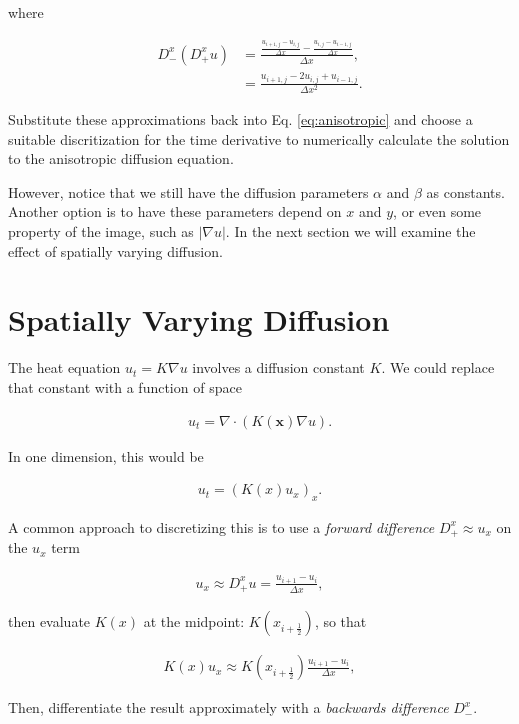 \documentclass[11pt,a4paper,noindent]{article}
\begin{document}
where 

\begin{align}
 D_-^x (D_+^x u) &= \frac{\frac{u_{i+1,j}-u_{i,j}}{\Delta x} - \frac{u_{i,j}-u_{i-1,j}}{\Delta x}}{\Delta x}, \\
 &= \frac{u_{i+1,j}-2u_{i,j} +u_{i-1,j}}{\Delta x^2}.
\end{align}

Substitute these approximations back into Eq. \ref{eq:anisotropic} and choose a suitable discritization for the time derivative to numerically calculate the solution to the anisotropic diffusion equation.

However, notice that we still have the diffusion parameters $\alpha$ and $\beta$ as constants. Another option is to have these parameters depend on $x$ and $y$, or even some property of the image, such as $|\nabla u|$. In the next section we will examine the effect of spatially varying diffusion.

\section{Spatially Varying Diffusion}

The heat equation $u_t = K \nabla u$ involves a diffusion constant $K$. We could replace that constant with a function of space

\begin{align}
u_t = \nabla \cdot (K(\mathbf{x}) \nabla u).
\end{align}

In one dimension, this would be

\begin{align}
u_t = (K(x) u_x)_x.
\end{align}

A common approach to discretizing this is to use a \emph{forward difference} $D_+^x \approx u_x$ on the $u_x$ term

\begin{align}
u_x \approx D_+^x u = \frac{u_{i+1}-u_{i}}{\Delta x},
\end{align}

then evaluate $K(x)$ at the midpoint: $K(x_{i+\frac{1}{2}})$, so that

\begin{align}
K(x) u_x \approx K(x_{i+\frac{1}{2}}) \frac{u_{i+1}-u_{i}}{\Delta x},
\end{align}

Then, differentiate the result approximately with a \emph{backwards difference} $D_-^x$. 
\end{document}
